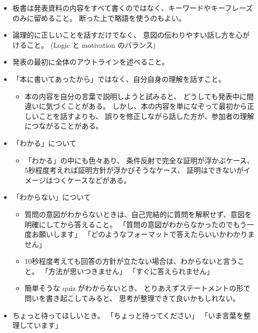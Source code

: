 \documentclass[report, notitlepage]{jlreq}
\begin{document}
\begin{itemize}
    \item 板書は発表資料の内容をすべて書くのではなく、キーワードやキーフレーズのみに留めること。
        断った上で略語を使うのもよい。
    \item 論理的に正しいことを話すだけでなく、
        意図の伝わりやすい話し方を心がけること。
        (Logic と motivation のバランス)
    \item 発表の最初に全体のアウトラインを述べること。
    \item 「本に書いてあったから」ではなく、自分自身の理解を話すこと。
        \begin{itemize}
            \item 本の内容を自分の言葉で説明しようと試みると、
                どうしても発表中に間違いに気づくことがある。
                しかし、本の内容を単になぞって最初から正しいことを話すよりも、
                誤りを修正しながら話した方が、参加者の理解につながることがある。
        \end{itemize}
    \item 「わかる」について
        \begin{itemize}
            \item 「わかる」の中にも色々あり、
                条件反射で完全な証明が浮かぶケース、
                5秒程度考えれば証明方針が浮かびそうなケース、
                証明はできないがイメージはつくケースなどがある。
        \end{itemize}
    \item 「わからない」について
        \begin{itemize}
            \item 質問の意図がわからないときは、自己完結的に質問を解釈せず、意図を明確にしてから答えること。
                「質問の意図がわからなかったのでもう一度お願いします」
                「どのようなフォーマットで答えたらいいかわかりません」
            \item 10秒程度考えても回答の方針が立たない場合は、わからないと言うこと。
                「方法が思いつきません」
                「すぐに答えられません」
            \item 簡単そうな quiz がわからないとき、
                とりあえずステートメントの形で問いを書き起こしてみると、
                思考が整理できて良いかもしれない。
        \end{itemize}
    \item ちょっと待ってほしいとき。
        「ちょっと待ってください」
        「いま言葉を整理しています」
\end{itemize}
\end{document}
